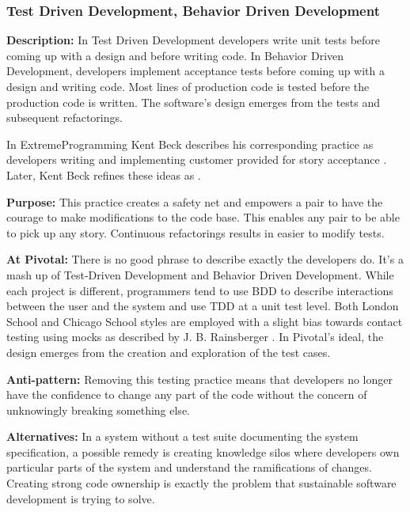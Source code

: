 \begin{table}[]
\subsubsection{Test Driven Development, Behavior Driven Development}
\textbf{Description:} In Test Driven Development developers write unit tests before coming up with a design and before writing code. In Behavior Driven Development, developers implement acceptance tests before coming up with a design and writing code.  Most lines of production code is tested before the production code is written. The software's design emerges from the tests and subsequent refactorings.

In ExtremeProgramming Kent Beck describes his corresponding  practice as developers writing  and implementing customer provided  for story acceptance \cite{ExtremeProgramming2000}. Later, Kent Beck refines these ideas as  \cite{ExtremeProgramming2004}. 

\textbf{Purpose:} This practice creates a safety net and empowers a pair to have the courage to make modifications to the code base. This enables any pair to be able to pick up any story. Continuous refactorings results in easier to modify tests.

\textbf{At Pivotal:} There is no good phrase to describe exactly the developers do. It's a mash up of Test-Driven Development and Behavior Driven Development. While each project is different, programmers tend to use BDD to describe interactions between the user and the system and use TDD at a unit test level. Both London School and Chicago School styles are employed with a slight bias towards contact testing using mocks as described by J. B. Rainsberger \cite{RainsbergerIntegrationTestsYouTube}. In Pivotal's ideal, the design emerges from the creation and exploration of the test cases.  

\textbf{Anti-pattern:} Removing this testing practice means that developers no longer have the confidence to change any part of the code without the concern of unknowingly breaking something else. 

\textbf{Alternatives:} In a system without a test suite documenting the system specification, a possible remedy is creating knowledge silos where developers own particular parts of the system and understand the ramifications of changes. Creating strong code ownership is exactly the problem that sustainable software development is trying to solve.


\end{table}
